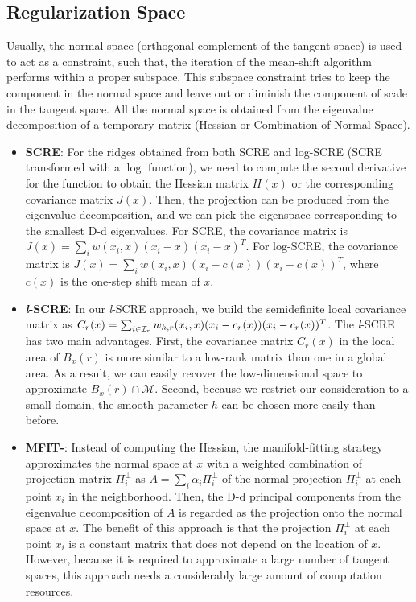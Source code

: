 \documentclass[aos,preprint]{imsart}
\theoremstyle{remark}
\begin{document}
\begin{appendix}
\subsection{Regularization Space}
Usually, the normal space (orthogonal complement of the tangent space) is used to act as a constraint, such that, the iteration of the mean-shift algorithm performs within a proper subspace. This subspace constraint tries to keep the component in the normal space and leave out or diminish the component of scale in the tangent space. All the normal space is obtained from the eigenvalue decomposition of a temporary matrix (Hessian or Combination of Normal Space).
\begin{itemize}
\item{\bf SCRE}:  For the ridges obtained from both SCRE and {log}-SCRE (SCRE transformed with a $\log$ function), we need to compute the second derivative for the function to obtain the Hessian matrix $H(x)$ or the corresponding covariance matrix $J(x)$. Then, the projection can be produced from the eigenvalue decomposition, and we can pick the eigenspace corresponding to the smallest D-d eigenvalues. For SCRE, the covariance matrix is $J(x) = \sum_i w(x_i,x)(x_i-x)(x_i-x)^T$. For {log}-SCRE, the covariance matrix is $J(x) = \sum_i w(x_i,x)(x_i-c(x))(x_i-c(x))^T$, where $c(x)$ is the one-step shift mean of $x$.

\item{\bf {\it l}-SCRE}: In our {\it l}-SCRE approach, we build the semidefinite local covariance matrix as $C_{r}(x)=\sum_{i\in {\cal I}_r} w_{h,r}(x_i, x)(x_i-c_r(x))(x_i-c_r(x))^T$. The {\it l}-SCRE has two main advantages. First, the covariance matrix $C_{r}(x)$ in the local area of $B_{{x}}(r)$ is more similar to a low-rank matrix than one in a global area. As a result, we can easily recover the low-dimensional space to approximate $B_{{x}}(r)\cap \mathcal M$. Second, because we restrict our consideration to a small domain, the smooth parameter $h$ can be chosen more easily than before.

\item{\bf MFIT-}: Instead of computing the Hessian, the manifold-fitting strategy \cite{fefferman2018fitting}  approximates the normal space at ${x}$ with a weighted combination of projection matrix $\Pi_i^{\perp}$ as $A = \sum_i \alpha_i \Pi_i^{\perp}$ of the normal projection $\Pi_i^{\perp}$ at each point $x_i$ in the neighborhood. Then, the D-d principal components from the eigenvalue decomposition of $A$ is regarded as the projection onto the normal space at ${x}$. The benefit of this approach is that the projection $\Pi_i^{\perp}$ at each point $x_i$ is a constant matrix that does not depend on the location of ${x}$. However, because it is required to approximate a large number of tangent spaces, this approach needs  a considerably large amount of computation resources.


\end{itemize}
\end{appendix}
\end{document}
